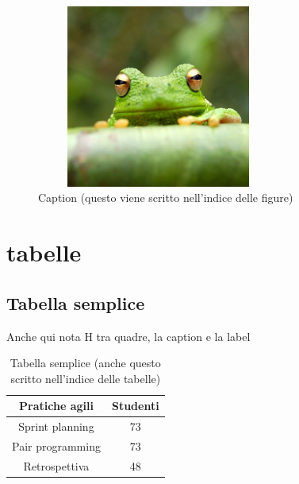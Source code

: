 \documentclass[12pt,a4paper,twoside]{book}
\begin{document}
\begin{figure}[H]
    \centering
    \includegraphics[height = 6cm, width=8cm]{img/frog.jpg}
    \caption{Caption (questo viene scritto nell'indice delle figure)}
    \label{fig:frog}
\end{figure}

\section{tabelle}
\subsection{Tabella semplice}
Anche qui nota H tra quadre, la caption e la label

\begin{table}[H]
    \centering
    \begin{tabular}{|c|c|}
    \hline
        \textbf{Pratiche agili} & \textbf{Studenti}  \\ \hline
        Sprint planning & 73  \\ \hline
        Pair programming & 73  \\ \hline
        Retrospettiva & 48  \\ \hline
    \end{tabular}
    \caption{Tabella semplice (anche questo scritto nell'indice delle tabelle)}
    \label{tab:simple}
\end{table}
\end{document}

